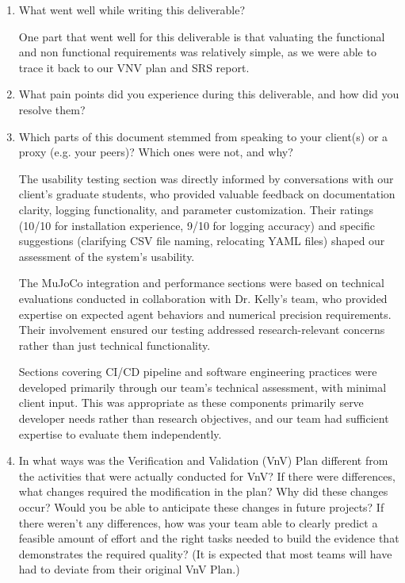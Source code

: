 \documentclass[12pt, titlepage]{article}
\begin{document}
\begin{enumerate}
  \item What went well while writing this deliverable? 

  One part that went well for this deliverable is that valuating the functional and non functional requirements was relatively simple, as we were able to trace it back to our VNV plan and SRS report.
  \item What pain points did you experience during this deliverable, and how
    did you resolve them?
  \item Which parts of this document stemmed from speaking to your client(s) or
  a proxy (e.g. your peers)? Which ones were not, and why?
  
  The usability testing section was directly informed by conversations with our client's graduate students, who provided valuable feedback on documentation clarity, logging functionality, and parameter customization. Their ratings (10/10 for installation experience, 9/10 for logging accuracy) and specific suggestions (clarifying CSV file naming, relocating YAML files) shaped our assessment of the system's usability.

  The MuJoCo integration and performance sections were based on technical evaluations conducted in collaboration with Dr. Kelly's team, who provided expertise on expected agent behaviors and numerical precision requirements. Their involvement ensured our testing addressed research-relevant concerns rather than just technical functionality.

  Sections covering CI/CD pipeline and software engineering practices were developed primarily through our team's technical assessment, with minimal client input. This was appropriate as these components primarily serve developer needs rather than research objectives, and our team had sufficient expertise to evaluate them independently.

  \item In what ways was the Verification and Validation (VnV) Plan different
  from the activities that were actually conducted for VnV?  If there were
  differences, what changes required the modification in the plan?  Why did
  these changes occur?  Would you be able to anticipate these changes in future
  projects?  If there weren't any differences, how was your team able to clearly
  predict a feasible amount of effort and the right tasks needed to build the
  evidence that demonstrates the required quality?  (It is expected that most
  teams will have had to deviate from their original VnV Plan.)
  

\end{enumerate}
\end{document}
